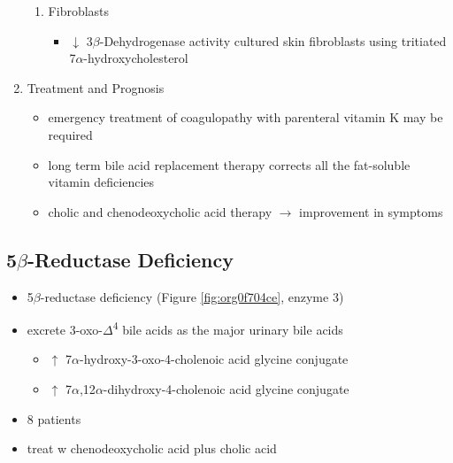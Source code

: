 \documentclass[12pt]{scrartcl}
\begin{document}
\begin{enumerate}
\begin{enumerate}
\item Fibroblasts
\label{sec:org7908fb8}
\begin{itemize}
\item \(\downarrow\) 3\(\beta\)-Dehydrogenase activity cultured skin fibroblasts using
tritiated 7\(\alpha\)-hydroxycholesterol
\end{itemize}
\end{enumerate}

\item Treatment and Prognosis
\label{sec:org286334b}
\begin{itemize}
\item emergency treatment of coagulopathy with parenteral vitamin K may be required
\item long term bile acid replacement therapy corrects all the fat-soluble
vitamin deficiencies

\item cholic and chenodeoxycholic acid therapy \(\to\) improvement in symptoms
\end{itemize}
\end{enumerate}

\subsection{5\(\beta\)-Reductase Deficiency}
\label{sec:orga3f518a}
\begin{itemize}
\item 5\(\beta\)-reductase deficiency (Figure \ref{fig:org0f704ce}, enzyme 3)
\item excrete 3-oxo-\(\Delta\)\textsuperscript{4} bile acids as the major urinary bile acids
\begin{itemize}
\item \(\uparrow\) 7\(\alpha\)-hydroxy-3-oxo-4-cholenoic acid glycine conjugate
\item \(\uparrow\) 7\(\alpha\),12\(\alpha\)-dihydroxy-4-cholenoic acid glycine conjugate
\end{itemize}
\item 8 patients
\item treat w chenodeoxycholic acid plus cholic acid
\end{itemize}
\end{document}
